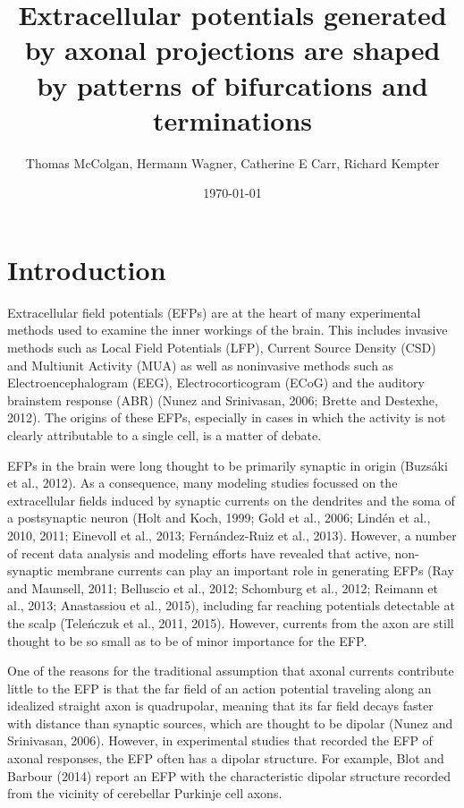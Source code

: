 \documentclass[]{article}
\title{Extracellular potentials generated by axonal projections are shaped by
patterns of bifurcations and terminations}
\author{Thomas McColgan, Hermann Wagner, Catherine E Carr, Richard Kempter}
\date{\today}
\begin{document}
\maketitle

\section{Introduction}\label{introduction}

Extracellular field potentials (EFPs) are at the heart of many
experimental methods used to examine the inner workings of the brain.
This includes invasive methods such as Local Field Potentials (LFP),
Current Source Density (CSD) and Multiunit Activity (MUA) as well as
noninvasive methods such as Electroencephalogram (EEG),
Electrocorticogram (ECoG) and the auditory brainstem response (ABR)
(Nunez and Srinivasan, 2006; Brette and Destexhe, 2012). The origins of
these EFPs, especially in cases in which the activity is not clearly
attributable to a single cell, is a matter of debate.

EFPs in the brain were long thought to be primarily synaptic in origin
(Buzsáki et al., 2012). As a consequence, many modeling studies focussed
on the extracellular fields induced by synaptic currents on the
dendrites and the soma of a postsynaptic neuron (Holt and Koch, 1999;
Gold et al., 2006; Lindén et al., 2010, 2011; Einevoll et al., 2013;
Fernández-Ruiz et al., 2013). However, a number of recent data analysis
and modeling efforts have revealed that active, non-synaptic membrane
currents can play an important role in generating EFPs (Ray and
Maunsell, 2011; Belluscio et al., 2012; Schomburg et al., 2012; Reimann
et al., 2013; Anastassiou et al., 2015), including far reaching
potentials detectable at the scalp (Teleńczuk et al., 2011, 2015).
However, currents from the axon are still thought to be so small as to
be of minor importance for the EFP.

One of the reasons for the traditional assumption that axonal currents
contribute little to the EFP is that the far field of an action
potential traveling along an idealized straight axon is quadrupolar,
meaning that its far field decays faster with distance than synaptic
sources, which are thought to be dipolar (Nunez and Srinivasan, 2006).
However, in experimental studies that recorded the EFP of axonal
responses, the EFP often has a dipolar structure. For example, Blot and
Barbour (2014) report an EFP with the characteristic dipolar structure
recorded from the vicinity of cerebellar Purkinje cell axons.
\end{document}
